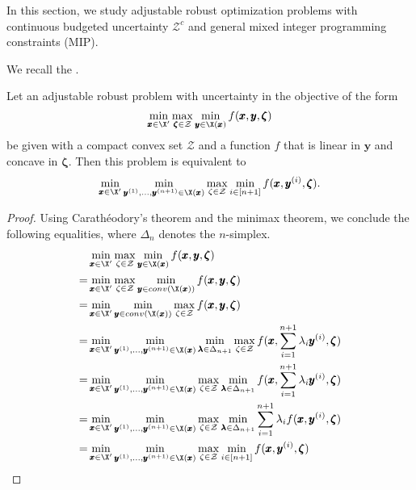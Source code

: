 \documentclass[a4paper,abstracton]{scrartcl}
\begin{document}
In this section, we study adjustable robust optimization problems with 
continuous budgeted uncertainty $\mathcal{Z}^{c}$ and general mixed integer programming constraints (MIP).

We recall the  \cite{bold2020}.

\begin{theorem}\label{th1}
Let an adjustable robust problem with uncertainty in the objective of the form
\[ \min_{\pmb{x}\in \X'} \max_{\pmb{\zeta}\in\mathcal{Z}} \min_{\pmb{y}\in\X(\pmb{x})} f(\pmb{x},\pmb{y},\pmb{\zeta}) \]
be given with a compact convex set $\mathcal{Z}$ and a function $f$ that is linear in $\pmb{y}$ and concave in $\pmb{\zeta}$. Then this problem is equivalent to
\[ \min_{\pmb{x}\in\X'} \min_{\pmb{y}^{(1)},\ldots,\pmb{y}^{(n+1)}\in\X(\pmb{x})} \max_{\zeta\in\mathcal{Z}} \min_{i\in[n+1]} f(\pmb{x},\pmb{y}^{(i)},\pmb{\zeta}). \]
\end{theorem}
\begin{proof}
Using Carath\'eodory's theorem and the minimax theorem, we conclude the following equalities, where $\Delta_n$ denotes the $n$-simplex.
\begin{align*}
&\min_{\pmb{x}\in\X'} \max_{\zeta\in\mathcal{Z}}\min_{\pmb{y}\in\X(\pmb{x})} f(\pmb{x},\pmb{y},\pmb{\zeta}) \\
% 
= & \min_{\pmb{x}\in\X'} \max_{\zeta\in\mathcal{Z}}\min_{\pmb{y}\in conv(\X(\pmb{x}))} f(\pmb{x},\pmb{y},\pmb{\zeta}) \\
% 
= & \min_{\pmb{x}\in\X'} \min_{\pmb{y}\in conv(\X(\pmb{x}))} \max_{\zeta\in\mathcal{Z}} f(\pmb{x},\pmb{y},\pmb{\zeta}) \\
% 
= & \min_{\pmb{x}\in\X'} 
\min_{\pmb{y}^{(1)},\ldots,\pmb{y}^{(n+1)}\in\X(\pmb{x})} \min_{\pmb{\lambda}\in\Delta_{n+1}} 
\max_{\zeta\in\mathcal{Z}} f(\pmb{x}, \sum_{i=1}^{n+1}\lambda_i\pmb{y}^{(i)},\pmb{\zeta}) \\
% 
= & \min_{\pmb{x}\in\X'} \min_{\pmb{y}^{(1)},\ldots,\pmb{y}^{(n+1)}\in\X(\pmb{x})}  
\max_{\zeta\in\mathcal{Z}} \min_{\pmb{\lambda}\in\Delta_{n+1}} f(\pmb{x}, \sum_{i=1}^{n+1}\lambda_i\pmb{y}^{(i)},\pmb{\zeta}) \\
% 
= & \min_{\pmb{x}\in\X'} \min_{\pmb{y}^{(1)},\ldots,\pmb{y}^{(n+1)}\in\X(\pmb{x})}  
\max_{\zeta\in\mathcal{Z}} \min_{\pmb{\lambda}\in\Delta_{n+1}} \sum_{i=1}^{n+1}\lambda_i f(\pmb{x}, \pmb{y}^{(i)},\pmb{\zeta}) \\
% 
= & \min_{\pmb{x}\in\X'} \min_{\pmb{y}^{(1)},\ldots,\pmb{y}^{(n+1)}\in\X(\pmb{x})}  
\max_{\zeta\in\mathcal{Z}} \min_{i\in[n+1]} f(\pmb{x}, \pmb{y}^{(i)},\pmb{\zeta}) 
\end{align*}
\end{proof}
\end{document}
